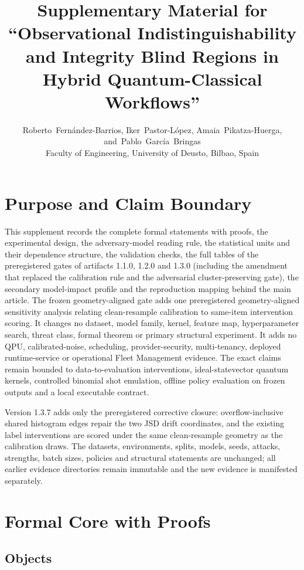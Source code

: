 \documentclass[10pt,journal,compsoc]{IEEEtran}
\title{Supplementary Material for ``Observational Indistinguishability and Integrity Blind Regions in Hybrid Quantum-Classical Workflows''}
\author{Roberto~Fern\'andez-Barrios, Iker~Pastor-L\'opez, Amaia~Pikatza-Huerga,
and~Pablo~Garc\'ia~Bringas\\ Faculty of Engineering, University of Deusto,
Bilbao, Spain}
\begin{document}
\maketitle

\section{Purpose and Claim Boundary}

This supplement records the complete formal statements with proofs, the
experimental design, the adversary-model reading rule, the statistical units
and their dependence structure, the validation checks, the full tables of the
preregistered gates of artifacts 1.1.0, 1.2.0 and 1.3.0 (including the
amendment that replaced the calibration rule and the adversarial
cluster-preserving gate), the secondary model-impact profile and the
reproduction mapping behind the main article. The frozen geometry-aligned gate adds one
preregistered geometry-aligned sensitivity analysis relating clean-resample
calibration to same-item intervention scoring. It changes no dataset, model
family, kernel, feature map, hyperparameter search, threat class, formal
theorem or primary structural experiment. It adds no QPU,
calibrated-noise, scheduling, provider-security, multi-tenancy, deployed
runtime-service or operational Fleet Management evidence. The exact claims
remain bounded to data-to-evaluation interventions, ideal-statevector quantum
kernels, controlled binomial shot emulation, offline policy evaluation on
frozen outputs and a local executable contract.

Version 1.3.7 adds only the preregistered corrective closure: overflow-inclusive
shared histogram edges repair the two JSD drift coordinates, and the existing
label interventions are scored under the same clean-resample geometry as the
calibration draws. The datasets, environments, splits, models, seeds, attacks,
strengths, batch sizes, policies and structural statements are unchanged;
all earlier evidence directories remain immutable and the new evidence is
manifested separately.

\section{Formal Core with Proofs}

\subsection{Objects}
\end{document}
